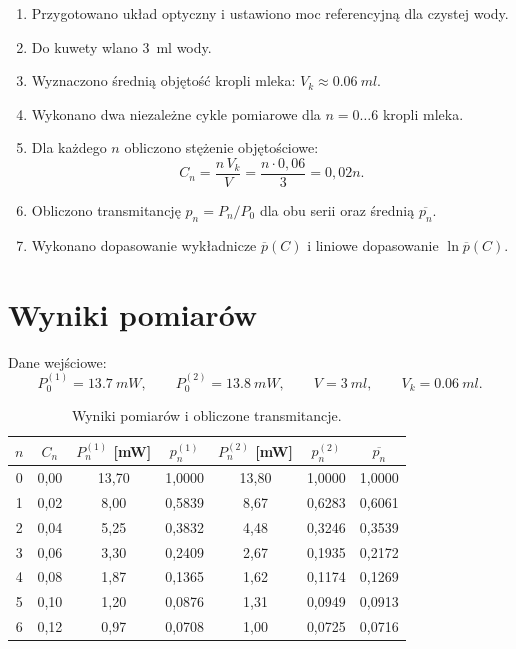 \documentclass[a4paper,12pt]{article}
\begin{document}
\begin{enumerate}
  \item Przygotowano układ optyczny i ustawiono moc referencyjną dla czystej wody.
  \item Do kuwety wlano \SI{3}{ml} wody.
  \item Wyznaczono średnią objętość kropli mleka: $V_k \approx \SI{0,06}{ml}$.
  \item Wykonano dwa niezależne cykle pomiarowe dla $n=0\dots6$ kropli mleka.
  \item Dla każdego $n$ obliczono stężenie objętościowe:
  \[
  C_n = \frac{n\,V_k}{V}=\frac{n\cdot0{,}06}{3}=0{,}02n.
  \]
  \item Obliczono transmitancję $p_n=P_n/P_0$ dla obu serii oraz średnią
  $\overline{p_n}$.
  \item Wykonano dopasowanie wykładnicze $\overline{p}(C)$ i liniowe dopasowanie
  $\ln\overline{p}(C)$.
\end{enumerate}

\section*{Wyniki pomiarów}

Dane wejściowe:
\[
P_0^{(1)}=\SI{13,7}{mW},\qquad P_0^{(2)}=\SI{13,8}{mW},\qquad V=\SI{3}{ml},\qquad V_k=\SI{0,06}{ml}.
\]

\begin{table}[H]
\centering
\caption{Wyniki pomiarów i obliczone transmitancje.}
\renewcommand{\arraystretch}{1.2}
\begin{tabular}{c S[table-format=1.2] S[table-format=2.2] S[table-format=1.4] S[table-format=2.2] S[table-format=1.4] S[table-format=1.4]}
\toprule
{$n$} & {$C_n$} & {$P_n^{(1)}$ [mW]} & {$p_n^{(1)}$} & {$P_n^{(2)}$ [mW]} & {$p_n^{(2)}$} & {$\overline{p_n}$} \\
 & 0,00 & 13,70 & 1,0000 & 13,80 & 1,0000 & 1,0000 \\
1 & 0,02 & 8,00  & 0,5839 & 8,67  & 0,6283 & 0,6061 \\
2 & 0,04 & 5,25  & 0,3832 & 4,48  & 0,3246 & 0,3539 \\
3 & 0,06 & 3,30  & 0,2409 & 2,67  & 0,1935 & 0,2172 \\
4 & 0,08 & 1,87  & 0,1365 & 1,62  & 0,1174 & 0,1269 \\
5 & 0,10 & 1,20  & 0,0876 & 1,31  & 0,0949 & 0,0913 \\
6 & 0,12 & 0,97  & 0,0708 & 1,00  & 0,0725 & 0,0716 \\
\bottomrule
\end{tabular}
\end{table}
\end{document}
